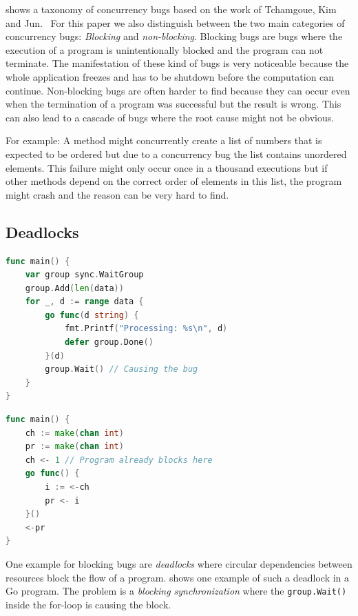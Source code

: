 \documentclass[conference]{IEEEtran}
\begin{document}
 shows a taxonomy of concurrency bugs based on the work of Tchamgoue, Kim and Jun.~\cite{tchamgoue2012testing}
For this paper we also distinguish between the two main categories of concurrency bugs: \emph{Blocking} and \emph{non-blocking}.
Blocking bugs are bugs where the execution of a program is unintentionally blocked and the program can not terminate.
The manifestation of these kind of bugs is very noticeable because the whole application freezes and has to be shutdown before the computation can continue.
Non-blocking bugs are often harder to find because they can occur even when the termination of a program was successful but the result is wrong.
This can also lead to a cascade of bugs where the root cause might not be obvious.

For example: A method might concurrently create a list of numbers that is expected to be ordered but due to a concurrency bug the list contains unordered elements.
This failure might only occur once in a thousand executions but if other methods depend on the correct order of elements in this list, the program might crash and the reason can be very hard to find.

\subsection{Deadlocks}
\begin{lstlisting}[float=h, language=Go, label=lst:deadlockWG, caption=Deadlock caused by waiting for the \emph{WaitGroup} at a wrong location -- based on \cite{tu2019go}]
func main() {
    var group sync.WaitGroup
    group.Add(len(data))
    for _, d := range data {
        go func(d string) {
            fmt.Printf("Processing: %s\n", d)
            defer group.Done()
        }(d)
        group.Wait() // Causing the bug
    }
}
\end{lstlisting}

\begin{lstlisting}[float, language=Go, label=lst:deadlockCh, caption={Deadlock caused by misuse of an \emph{unbuffered Channel}}]
func main() {
    ch := make(chan int)
    pr := make(chan int)
    ch <- 1 // Program already blocks here
    go func() {
        i := <-ch
        pr <- i
    }()
    <-pr
}
\end{lstlisting}

One example for blocking bugs are \emph{deadlocks} where circular dependencies between resources block the flow of a program.
 shows one example of such a deadlock in a Go program.
The problem is a \emph{blocking synchronization} where the \lstinline{group.Wait()} inside the for-loop is causing the block.
\end{document}

